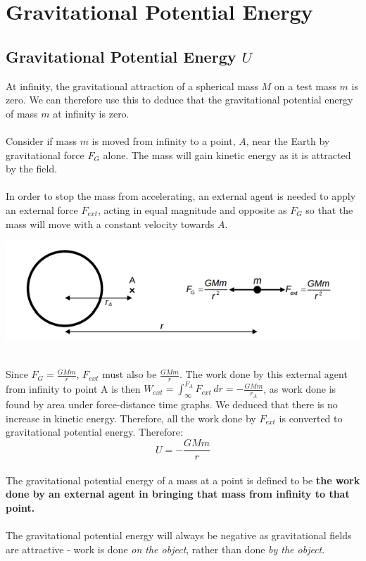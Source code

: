 \documentclass{article}
\begin{document}
\section{Gravitational Potential Energy}
\subsection{Gravitational Potential Energy $U$}
At infinity, the gravitational attraction of a spherical mass $M$ on a test mass $m$ is zero. We can therefore use this to deduce that the gravitational potential energy of mass $m$ at infinity is zero.
\\
\\Consider if mass $m$ is moved from infinity to a point, $A$, near the Earth by gravitational force $F_G$ alone.
The mass will gain kinetic energy as it is attracted by the field.
\\
\\In order to stop the mass from accelerating, an external agent is needed to apply an external force $F_{ext}$, acting in equal magnitude and opposite as $F_G$ so that the mass will move with a constant velocity towards $A$.
\begin{center}
    \includegraphics[scale=0.6]{assets/infinity.png}
\end{center}\leavevmode
\\
Since $F_G=\frac{GMm}{r}$, $F_{ext}$ must also be $\frac{GMm}{r}$. The work done by this external agent from infinity to point A is then $W_{ext}=\int_{\infty}^{F_A} F_{ext} \,dr =-\frac{GMm}{r_A}$, as work done is found by area under force-distance time graphs.
We deduced that there is no increase in kinetic energy. Therefore, all the work done by $F_{ext}$ is converted to gravitational potential energy. Therefore:
\begin{equation}
    U=-\frac{GMm}{r}
\end{equation}
\\
The gravitational potential energy of a mass at a point is defined to be \textbf{the work done by an external agent in bringing that mass from infinity to that point.}
\\
\\The gravitational potential energy will always be negative as gravitational fields are attractive - work is done \textit{on the object}, rather than done \textit{by the object}. 
\pagebreak
\end{document}
